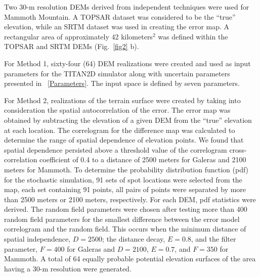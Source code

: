 \documentclass{article}
\begin{document}
Two 30-m resolution DEMs derived from independent techniques were used
for Mammoth Mountain.  A TOPSAR dataset was considered to be the
``true'' elevation, while an SRTM dataset was used in creating the
error map.  A rectangular area of approximately 42 kilometers$^2$ was
defined within the TOPSAR and SRTM DEMs (Fig.~\ref{fig2} b).

For Method 1, sixty-four (64) DEM realizations were created and used
as input parameters for the TITAN2D simulator along with uncertain
parameters presented in ~\ref{Parameters}.  The input space is defined
by seven parameters.



For Method 2, realizations of the terrain surface were created by
taking into consideration the spatial autocorrelation of the error.
The error map was obtained by subtracting the elevation of a given DEM
from the ``true'' elevation at each location. The correlogram for the
difference map was calculated to determine the range of spatial
dependence of elevation points. We found that spatial dependence
persisted above a threshold value of the correlogram cross-correlation
coefficient of 0.4 to a distance of 2500 meters for Galeras and 2100
meters for Mammoth. To determine the probability distribution function
(pdf) for the stochastic simulation, 91 sets of spot locations were
selected from the map, each set containing 91 points, all pairs of
points were separated by more than 2500 meters or 2100 meters,
respectively. For each DEM, pdf statistics were derived.  The random
field parameters were chosen after testing more than 400 random field
parameters for the smallest difference between the error model
correlogram and the random field.  This occurs when the minimum
distance of spatial independence, $D =2500$; the distance decay, $E =
0.8$, and the filter parameter, $F =400$ for Galeras and $D =2100$, $E
= 0.7$, and $F =350$ for Mammoth.  A total of 64 equally probable
potential elevation surfaces of the area having a 30-m resolution were
generated.
\end{document}
